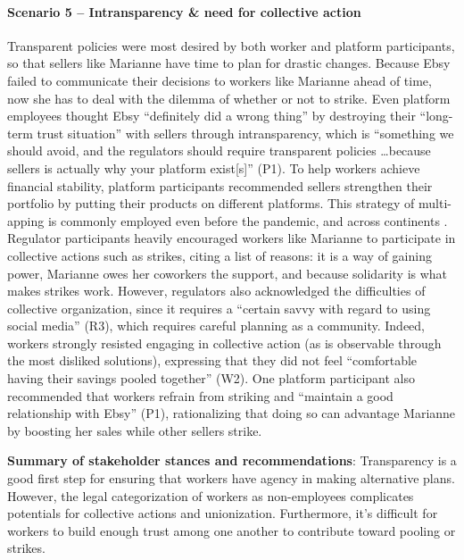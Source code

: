 \paragraph{Scenario 5 -- Intransparency \& need for collective action} \label{s5}

Transparent policies were most desired by both worker and platform participants, so that sellers like Marianne have time to plan for drastic changes. Because Ebsy failed to communicate their decisions to workers like Marianne ahead of time, now she has to deal with the dilemma of whether or not to strike. Even platform employees thought Ebsy ``definitely did a wrong thing'' by destroying their ``long-term trust situation'' with sellers through intransparency, which is ``something we should avoid, and the regulators should require transparent policies \dots because sellers is actually why your platform exist[s]'' (P1). To help workers achieve financial stability, platform participants recommended sellers strengthen their portfolio by putting their products on different platforms. This strategy of multi-apping is commonly employed even before the pandemic, and across continents \cite{goods2019your}. 
Regulator participants heavily encouraged workers like Marianne to participate in collective actions such as strikes, citing a list of reasons: it is a way of gaining power, Marianne owes her coworkers the support, and because solidarity is what makes strikes work. 
However, regulators also acknowledged the difficulties of collective organization, since it requires a ``certain savvy with regard to using social media'' (R3), which requires careful planning as a community. Indeed, workers strongly resisted engaging in collective action (as is observable through the most disliked solutions), expressing that they did not feel ``comfortable having their savings pooled together'' (W2). One platform participant also recommended that workers refrain from striking and ``maintain a good relationship with Ebsy'' (P1), rationalizing that doing so can advantage Marianne by boosting her sales while other sellers strike. 

\textbf{Summary of stakeholder stances and recommendations}: Transparency is a good first step for ensuring that workers have agency in making alternative plans. However, the legal categorization of workers as non-employees complicates potentials for collective actions and unionization. Furthermore, it's difficult for workers to build enough trust among one another to contribute toward pooling or strikes.

